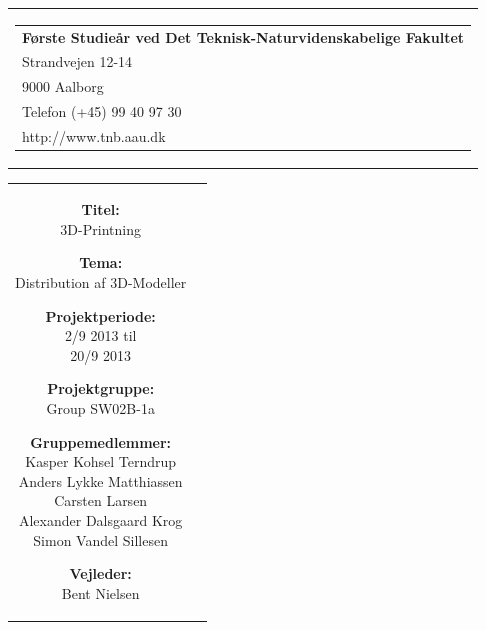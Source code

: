 
% 
\thispagestyle{empty}
{\samepage 
\begin{tabular}{r}
	\parbox{\textwidth}{  
	\hfill \parbox{7cm}{\begin{tabular}{l} %
		{\small \textbf{Første Studieår ved Det Teknisk-Naturvidenskabelige Fakultet}}\\
		{\small Strandvejen 12-14} \\
		{\small 9000 Aalborg} \\
		{\small Telefon (+45) 99 40 97 30} \\
		{\small http://www.tnb.aau.dk}
	\end{tabular}}
	}
\end{tabular}

\begin{tabular}{cc}
	\parbox{8cm}{
	\begin{description}
		\item { \textbf{Titel:}}\\ 
			3D-Printning
    		\item { \textbf{Tema:}}\\ 
			Distribution af 3D-Modeller
	\end{description}
	
	\parbox{8cm}{
	\begin{description}
		\item { \textbf{Projektperiode:}}\\
			2/9 2013 til\\
			20/9 2013\\
 		\hspace{4cm}
		\item { \textbf{Projektgruppe:}}\\
  			Group SW02B-1a
 		\hspace{4cm}
		\item {\textbf{Gruppemedlemmer:}}\\
			Kasper Kohsel Terndrup\\
			Anders Lykke Matthiassen\\
			Carsten Larsen\\
			Alexander Dalsgaard Krog\\
			Simon Vandel Sillesen\\
		\hspace{2cm}
		\item { \textbf{Vejleder:}}\\
 			Bent Nielsen\\
  	\end{description}
	}

}
\end{tabular}}
